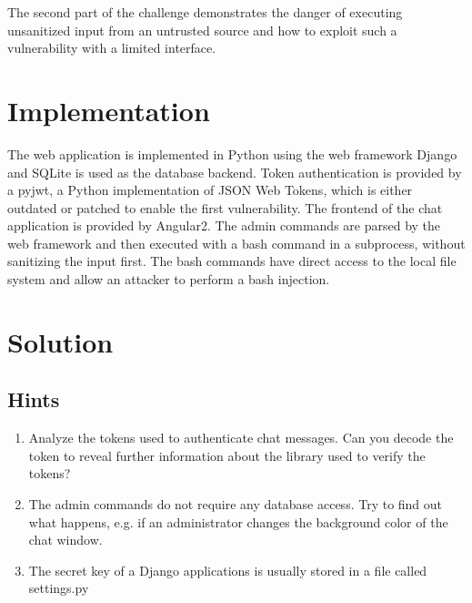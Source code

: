 \documentclass[12pt,a4paper]{article}
\begin{document}
The second part of the challenge demonstrates the danger of executing unsanitized input from an untrusted source and how to exploit such a vulnerability with a limited interface.


\section{Implementation}

The web application is implemented in Python using the web framework Django and SQLite is used as the database backend. Token authentication is provided by a pyjwt, a Python implementation of JSON Web Tokens, which is either outdated or patched to enable the first vulnerability. The frontend of the chat application is provided by Angular2. The admin commands are parsed by the web framework and then executed with a bash command in a subprocess, without sanitizing the input first. The bash commands have direct access to the local file system and allow an attacker to perform a bash injection.


\section{Solution}

\subsection{Hints}
\begin{enumerate}
	\item Analyze the tokens used to authenticate chat messages. Can you decode the token to reveal further information about the library used to verify the tokens?
	\item The admin commands do not require any database access. Try to find out what happens, e.g. if an administrator changes the background color of the chat window.
	\item The secret key of a Django applications is usually stored in a file called settings.py
\end{enumerate}
\end{document}
